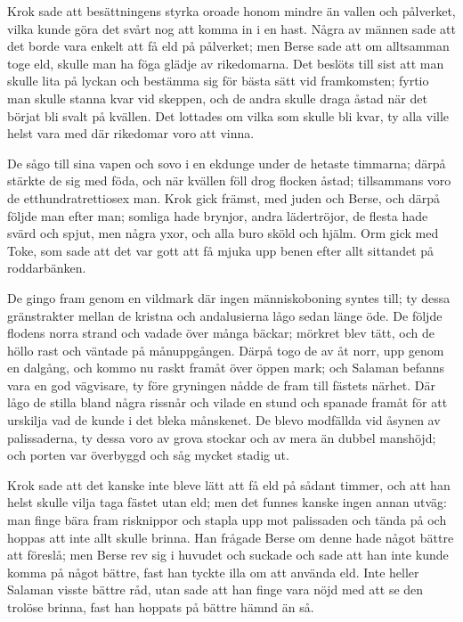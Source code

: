 \initial Krok sade att besättningens styrka oroade honom mindre än vallen och pålverket, vilka kunde göra det svårt nog att komma in i en hast. Några av männen sade att det borde vara enkelt att få eld på pålverket; men Berse sade att om alltsamman toge eld, skulle man ha föga glädje av rikedomarna. Det beslöts till sist att man skulle lita på lyckan och bestämma sig för bästa sätt vid framkomsten; fyrtio man skulle stanna kvar vid skeppen, och de andra skulle draga åstad när det börjat bli svalt på kvällen. Det lottades om vilka som skulle bli kvar, ty alla ville helst vara med där rikedomar voro att vinna.

\initial De sågo till sina vapen och sovo i en ekdunge under de hetaste timmarna; därpå stärkte de sig med föda, och när kvällen föll drog flocken åstad; tillsammans voro de etthundratrettiosex man. Krok gick främst, med juden och Berse, och därpå följde man efter man; somliga hade brynjor, andra lädertröjor, de flesta hade svärd och spjut, men några yxor, och alla buro sköld och hjälm. Orm gick med Toke, som sade att det var gott att få mjuka upp benen efter allt sittandet på roddarbänken.

\initial De gingo fram genom en vildmark där ingen människoboning syntes till; ty dessa gränstrakter mellan de kristna och andalusierna lågo sedan länge öde. De följde flodens norra strand och vadade över många bäckar; mörkret blev tätt, och de höllo rast och väntade på månuppgången. Därpå togo de av åt norr, upp genom en dalgång, och kommo nu raskt framåt över öppen mark; och Salaman befanns vara en god vägvisare, ty före gryningen nådde de fram till fästets närhet. Där lågo de stilla bland några rissnår och vilade en stund och spanade framåt för att urskilja vad de kunde i det bleka månskenet. De blevo modfällda vid åsynen av palissaderna, ty dessa voro av grova stockar och av mera än dubbel manshöjd; och porten var överbyggd och såg mycket stadig ut.

\initial Krok sade att det kanske inte bleve lätt att få eld på sådant timmer, och att han helst skulle vilja taga fästet utan eld; men det funnes kanske ingen annan utväg: man finge bära fram risknippor och stapla upp mot palissaden och tända på och hoppas att inte allt skulle brinna. Han frågade Berse om denne hade något bättre att föreslå; men Berse rev sig i huvudet och suckade och sade att han inte kunde komma på något bättre, fast han tyckte illa om att använda eld. Inte heller Salaman visste bättre råd, utan sade att han finge vara nöjd med att se den trolöse brinna, fast han hoppats på bättre hämnd än så.

